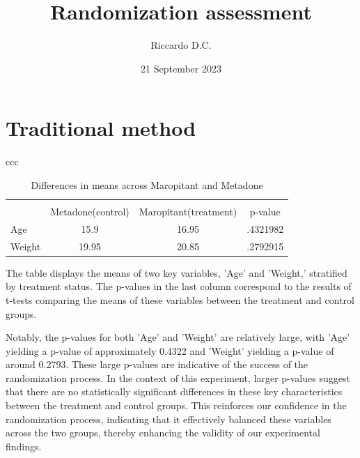 \documentclass{article}
\begin{document}
\title{Randomization assessment}
\author{Riccardo D.C.}
\date{21 September 2023}
\maketitle
\section{Traditional method}
\begin{table}[htbp]
    \centering
    \caption{Differences in means across Maropitant and Metadone}
    \begin{tabular}{ccc}
        \begin{tabular}{l*{3}{c}}
            \hline\hline
                        &     &            &            \\
                        &Metadone(control)&Maropitant(treatment)&     p-value\\
            \hline
            Age         &        15.9&       16.95&    .4321982\\
            Weight      &       19.95&       20.85&    .2792915\\
            \hline\hline
        \end{tabular}
            
    \end{tabular}
\end{table}
The table displays the means of two key variables, 'Age' and 'Weight,' stratified by treatment status. The p-values in
the last column correspond to the results of t-tests comparing the means of these variables between the treatment and
control groups. \\
\par
Notably, the p-values for both 'Age' and 'Weight' are relatively large, with 'Age' yielding a p-value of approximately
0.4322 and 'Weight' yielding a p-value of around 0.2793. These large p-values are indicative of the success of the
randomization process. In the context of this experiment, larger p-values suggest that there are no statistically
significant differences in these key characteristics between the treatment and control groups. This reinforces our
confidence in the randomization process, indicating that it effectively balanced these variables across the two groups,
thereby enhancing the validity of our experimental findings.
\end{document}
